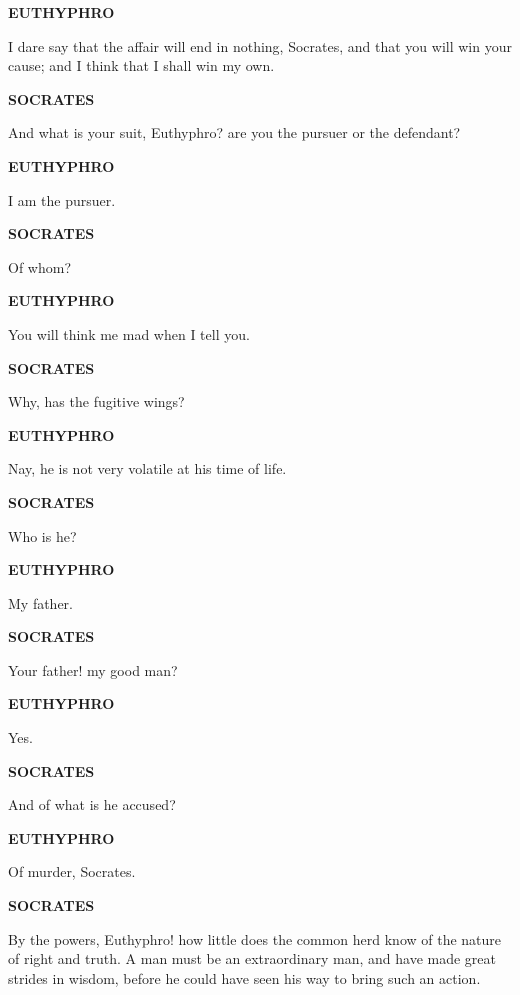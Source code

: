 \documentclass[11pt,letter]{article}
\begin{document}
\par \textbf{EUTHYPHRO}
\par   I dare say that the affair will end in nothing, Socrates, and that you will win your cause; and I think that I shall win my own.

\par \textbf{SOCRATES}
\par   And what is your suit, Euthyphro? are you the pursuer or the defendant?

\par \textbf{EUTHYPHRO}
\par   I am the pursuer.

\par \textbf{SOCRATES}
\par   Of whom?

\par \textbf{EUTHYPHRO}
\par   You will think me mad when I tell you.

\par \textbf{SOCRATES}
\par   Why, has the fugitive wings?

\par \textbf{EUTHYPHRO}
\par   Nay, he is not very volatile at his time of life.

\par \textbf{SOCRATES}
\par   Who is he?

\par \textbf{EUTHYPHRO}
\par   My father.

\par \textbf{SOCRATES}
\par   Your father! my good man?

\par \textbf{EUTHYPHRO}
\par   Yes.

\par \textbf{SOCRATES}
\par   And of what is he accused?

\par \textbf{EUTHYPHRO}
\par   Of murder, Socrates.

\par \textbf{SOCRATES}
\par   By the powers, Euthyphro! how little does the common herd know of the nature of right and truth. A man must be an extraordinary man, and have made great strides in wisdom, before he could have seen his way to bring such an action.
\end{document}
